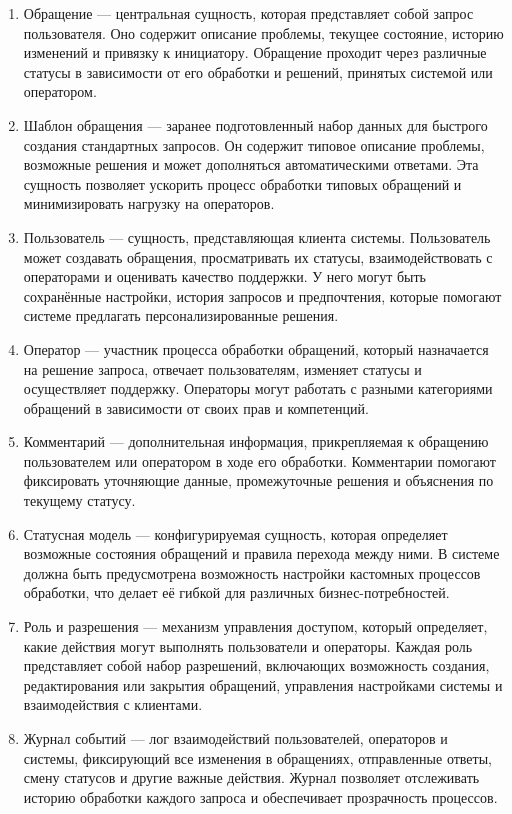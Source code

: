 \begin{enumerate}[label=\arabic*.]
    \item Обращение — центральная сущность, которая представляет собой запрос пользователя. Оно содержит описание проблемы, текущее состояние, историю изменений и привязку к инициатору. Обращение проходит через различные статусы в зависимости от его обработки и решений, принятых системой или оператором.

    \item Шаблон обращения — заранее подготовленный набор данных для быстрого создания стандартных запросов. Он содержит типовое описание проблемы, возможные решения и может дополняться автоматическими ответами. Эта сущность позволяет ускорить процесс обработки типовых обращений и минимизировать нагрузку на операторов.

    \item Пользователь — сущность, представляющая клиента системы. Пользователь может создавать обращения, просматривать их статусы, взаимодействовать с операторами и оценивать качество поддержки. У него могут быть сохранённые настройки, история запросов и предпочтения, которые помогают системе предлагать персонализированные решения.
    
    \item Оператор — участник процесса обработки обращений, который назначается на решение запроса, отвечает пользователям, изменяет статусы и осуществляет поддержку. Операторы могут работать с разными категориями обращений в зависимости от своих прав и компетенций.
    
    \item Комментарий — дополнительная информация, прикрепляемая к обращению пользователем или оператором в ходе его обработки. Комментарии помогают фиксировать уточняющие данные, промежуточные решения и объяснения по текущему статусу.
    
    \item Статусная модель — конфигурируемая сущность, которая определяет возможные состояния обращений и правила перехода между ними. В системе должна быть предусмотрена возможность настройки кастомных процессов обработки, что делает её гибкой для различных бизнес-потребностей.
    
    \item Роль и разрешения — механизм управления доступом, который определяет, какие действия могут выполнять пользователи и операторы. Каждая роль представляет собой набор разрешений, включающих возможность создания, редактирования или закрытия обращений, управления настройками системы и взаимодействия с клиентами.
    
    \item Журнал событий — лог взаимодействий пользователей, операторов и системы, фиксирующий все изменения в обращениях, отправленные ответы, смену статусов и другие важные действия. Журнал позволяет отслеживать историю обработки каждого запроса и обеспечивает прозрачность процессов.
    
\end{enumerate}

